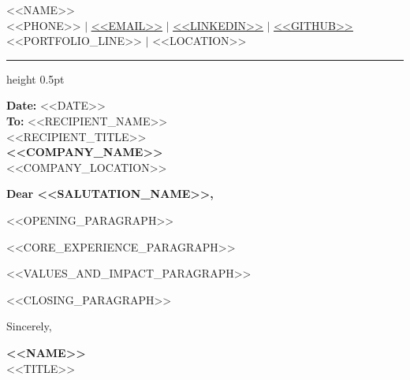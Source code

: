 \documentclass[letterpaper,11pt]{article}
\begin{document}
\begin{center}
    {\Huge \scshape <<NAME>>} \\ \vspace{4pt}
    \small <<PHONE>> $|$ \href{mailto:<<EMAIL>>}{\underline{<<EMAIL>>}} $|$ 
    \href{https://<<LINKEDIN>>}{\underline{<<LINKEDIN>>}} $|$
    \href{https://<<GITHUB>>}{\underline{<<GITHUB>>}}<<PORTFOLIO_LINE>> $|$
    <<LOCATION>>
\end{center}

\vspace{10pt}
\hrule height 0.5pt
\vspace{14pt}

\begin{flushleft}
    \textbf{Date:} <<DATE>> \\ \vspace{8pt}
    \textbf{To:} <<RECIPIENT_NAME>> \\
    <<RECIPIENT_TITLE>> \\
    \textbf{<<COMPANY_NAME>>} \\
    <<COMPANY_LOCATION>>
\end{flushleft}

\vspace{14pt}

\textbf{Dear <<SALUTATION_NAME>>,}\par

\vspace{8pt}

<<OPENING_PARAGRAPH>>\par

\vspace{10pt}

<<CORE_EXPERIENCE_PARAGRAPH>>\par

\vspace{10pt}

<<VALUES_AND_IMPACT_PARAGRAPH>>\par

\vspace{10pt}

<<CLOSING_PARAGRAPH>>\par

\vspace{18pt}

Sincerely,\par
\vspace{14pt}
\textbf{<<NAME>>}\\
<<TITLE>>
\end{document}
